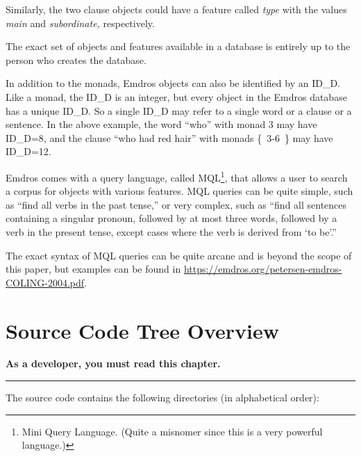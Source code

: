 \documentclass[11pt,oneside,a4paper]{memoir}
\begin{document}
Similarly, the two clause objects could have a feature called \emph{type} with the values
\emph{main} and \emph{subordinate,} respectively.

The exact set of objects and features available in a database is entirely up to the person who
creates the database.

In addition to the monads, Emdros objects can also be identified by an
ID\_D. Like a monad, the ID\_D is an integer, but
every object in the Emdros database has a unique ID\_D. So a single ID\_D may refer to a single word
or a clause or a sentence. In the above example, the word ``who'' with monad 3 may have ID\_D=8, and
the clause ``who had red hair'' with monads \{~3-6~\} may have ID\_D=12.

Emdros comes with a query language, called MQL\footnote{Mini Query Language.
  (Quite a misnomer since this is a very powerful language.)}, that allows a user to search a corpus
for objects with various features. MQL queries can be quite simple, such as ``find all verbs in the
past tense,'' or very complex, such as ``find all sentences containing a singular pronoun, followed
by at most three words, followed by a verb in the present tense, except cases where the verb is
derived from `to be'.''

The exact syntax of MQL queries can be quite arcane and is beyond the scope of this paper, but
examples can be found in \url{https://emdros.org/petersen-emdros-COLING-2004.pdf}.


\chapter{Source Code Tree Overview}

\textbf{As a developer, you must read this chapter.}
\plainbreak{3}

The source code contains the following directories (in alphabetical order):
\end{document}
